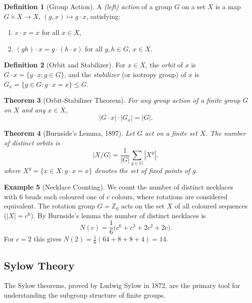 \documentclass[12pt,a4paper]{amsart}
\newtheorem{theorem}{Theorem}[section]
\theoremstyle{definition}
\newtheorem{definition}[theorem]{Definition}
\newtheorem{example}[theorem]{Example}
\begin{document}
\begin{definition}[Group Action]
A \emph{(left) action} of a group $G$ on a set $X$ is a map
$G \times X \to X$, $(g,x) \mapsto g \cdot x$, satisfying:
\begin{enumerate}[label=(\roman*)]
  \item $e \cdot x = x$ for all $x \in X$,
  \item $(gh) \cdot x = g \cdot (h \cdot x)$ for all $g,h \in G$, $x \in X$.
\end{enumerate}
\end{definition}

\begin{definition}[Orbit and Stabilizer]
For $x \in X$, the \emph{orbit} of $x$ is $G \cdot x = \{g \cdot x : g \in G\}$,
and the \emph{stabilizer} (or isotropy group) of $x$ is
$G_x = \{g \in G : g \cdot x = x\} \leq G$.
\end{definition}

\begin{theorem}[Orbit-Stabilizer Theorem]
\label{thm:orbit_stab}
For any group action of a finite group $G$ on $X$ and any $x \in X$,
\[
  |G \cdot x| \cdot |G_x| = |G|.
\]
\end{theorem}

\begin{theorem}[Burnside's Lemma, 1897]
\label{thm:burnside}
Let $G$ act on a finite set $X$. The number of distinct orbits is
\[
  |X/G| = \frac{1}{|G|} \sum_{g \in G} |X^g|,
\]
where $X^g = \{x \in X : g \cdot x = x\}$ denotes the set of fixed points of $g$.
\end{theorem}

\begin{example}[Necklace Counting]
We count the number of distinct necklaces with 6 beads each coloured one of $c$
colours, where rotations are considered equivalent. The rotation group $G = \mathbb{Z}_6$
acts on the set $X$ of all coloured sequences ($|X| = c^6$).
By Burnside's lemma the number of distinct necklaces is
\[
  N(c) = \frac{1}{6}\bigl(c^6 + c^3 + 2c^2 + 2c\bigr).
\]
For $c = 2$ this gives $N(2) = \tfrac{1}{6}(64 + 8 + 8 + 4) = 14$.
\end{example}

\subsection{Sylow Theory}

The Sylow theorems, proved by Ludwig Sylow in 1872, are the primary tool for understanding
the subgroup structure of finite groups.
\end{document}
